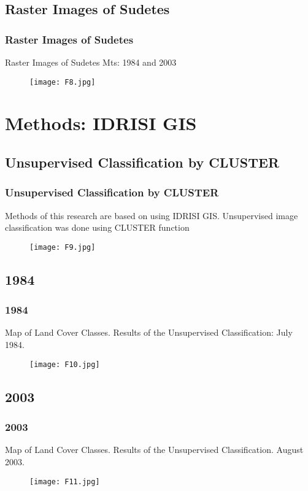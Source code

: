 \documentclass[pdflatex,compress,8pt,
	xcolor={dvipsnames,dvipsnames,svgnames,x11names,table},
	hyperref={
	breaklinks = true, 
	pdfauthor={Lemenkova Polina}, 
	pdfsubject={Preentation}, 
	pdfcreator={Lemenkova Polina}, 
	pdfproducer={Lemenkova Polina}, 
	citecolor=NavyBlue, 
	urlbordercolor=cyan,
	urlcolor = NavyBlue, 
	breaklinks = true}]{beamer}
\begin{document}
\subsection{Raster Images of Sudetes}
\begin{frame}\frametitle{Raster Images of Sudetes}
Raster Images of Sudetes Mts: 1984 and 2003
\begin{figure}[H]
	\centering
		\texttt{[image: F8.jpg]}
\end{figure}
\end{frame}

\section{Methods: IDRISI GIS}
\subsection{Unsupervised Classification by CLUSTER}
\begin{frame}\frametitle{Unsupervised Classification by CLUSTER}
Methods of this research are based on using IDRISI GIS. Unsupervised image classification was done using CLUSTER function
\begin{figure}[H]
	\centering
		\texttt{[image: F9.jpg]}
\end{figure}
\end{frame}

\subsection{1984}
\begin{frame}\frametitle{1984}
Map of Land Cover Classes. Results of the Unsupervised Classification: July 1984.
\begin{figure}[H]
	\centering
		\texttt{[image: F10.jpg]}
\end{figure}
\end{frame}

\subsection{2003}
\begin{frame}\frametitle{2003}
Map of Land Cover Classes. Results of the Unsupervised Classification. August 2003. 
\begin{figure}[H]
	\centering
		\texttt{[image: F11.jpg]}
\end{figure}
\end{frame}
\end{document}
